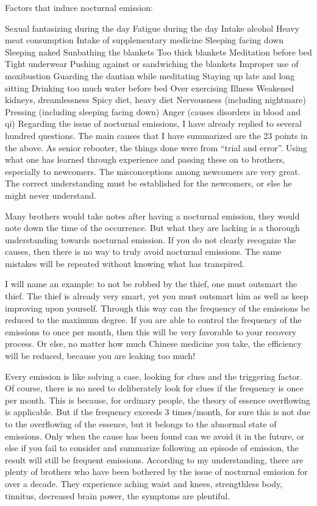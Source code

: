 \documentclass[
]{book}
\begin{document}
Factors that induce nocturnal emission:

Sexual fantasizing during the day
Fatigue during the day
Intake alcohol
Heavy meat consumption
Intake of supplementary medicine
Sleeping facing down
Sleeping naked
Sunbathing the blankets
Too thick blankets
Meditation before bed
Tight underwear
Pushing against or sandwiching the blankets
Improper use of moxibustion
Guarding the dantian while meditating
Staying up late and long sitting
Drinking too much water before bed
Over exercising
Illness
Weakened kidneys, dreamlessness
Spicy diet, heavy diet
Nervousness (including nightmare)
Pressing (including sleeping facing down)
Anger (causes disorders in blood and qi)
Regarding the issue of nocturnal emissions, I have already replied to several hundred questions. The main causes that I have summarized are the 23 points in the above. As senior rebooter, the things done were from ``trial and error''. Using what one has learned through experience and passing these on to brothers, especially to newcomers. The misconceptions among newcomers are very great. The correct understanding must be established for the newcomers, or else he might never understand.

Many brothers would take notes after having a nocturnal emission, they would note down the time of the occurrence. But what they are lacking is a thorough understanding towards nocturnal emission. If you do not clearly recognize the causes, then there is no way to truly avoid nocturnal emissions. The same mistakes will be repeated without knowing what has transpired.

I will name an example: to not be robbed by the thief, one must outsmart the thief. The thief is already very smart, yet you must outsmart him as well as keep improving upon yourself. Through this way can the frequency of the emissions be reduced to the maximum degree. If you are able to control the frequency of the emissions to once per month, then this will be very favorable to your recovery process. Or else, no matter how much Chinese medicine you take, the efficiency will be reduced, because you are leaking too much!

Every emission is like solving a case, looking for clues and the triggering factor. Of course, there is no need to deliberately look for clues if the frequency is once per month. This is because, for ordinary people, the theory of essence overflowing is applicable. But if the frequency exceeds 3 times/month, for sure this is not due to the overflowing of the essence, but it belongs to the abnormal state of emissions. Only when the cause has been found can we avoid it in the future, or else if you fail to consider and summarize following an episode of emission, the result will still be frequent emissions. According to my understanding, there are plenty of brothers who have been bothered by the issue of nocturnal emission for over a decade. They experience aching waist and knees, strengthless body, tinnitus, decreased brain power, the symptoms are plentiful.
\end{document}
